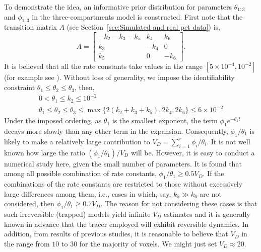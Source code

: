 To demonstrate the idea, an informative prior distribution for parameters $\theta_{1:3}$ and $\phi_{1:3}$ in the three-compartments model is constructed. First note that the transition matrix $A$ (see Section~\ref{sec:Simulated and real pet data}) is,
\begin{equation*}
  A = \begin{bmatrix}
    - k_2 - k_3 - k_5 & k_4  & k_6 \\
    k_3               & -k_4 & 0   \\
    k_5               & 0    & -k_6
  \end{bmatrix}.
\end{equation*}
It is believed that all the rate constants take values in the range $[5 \times 10^{-4}, 10^{-2}]$ (for example see \cite{Zhou2013,Peng:2008fx}). Without loss of generality, we impose the identifiability constraint $\theta_1 \leq \theta_2 \leq \theta_3$, then,
\begin{gather}
  0 < \theta_1 \le k_2 \le 10^{-2} \\
  \theta_1 \leq \theta_2 \leq \theta_3 \leq \max\{2(k_2 + k_3 + k_5), 2k_4,
  2k_6\} \le 6 \times 10^{-2}
\end{gather}
Under the imposed ordering, as $\theta_1$ is the smallest exponent, the term $\phi_1e^{-\theta_1 t}$ decays more slowly than any other term in the expansion. Consequently, $\phi_1/\theta_1$ is likely to make a relatively large contribution to $V_D = \sum_{i=1}^r \phi_i/\theta_i$. It is not well known how large the ratio $(\phi_1/\theta_1)/V_D$ will be. However, it is easy to conduct a numerical study here, given the small number of parameters. It is found that among all possible combination of rate constants, $\phi_1/ \theta_1 \ge 0.5 V_D$. If the combinations of the rate constants are restricted to those without excessively large differences among them, i.e., cases in which, say, $k_5 \gg k_6$ are not considered, then $\phi_1/\theta_1 \ge 0.7 V_D$. The reason for not considering these cases is that such irreversible (trapped) models yield infinite $V_D$ estimates and it is generally known in advance that the tracer employed will exhibit reversible dynamics. In addition, from results of previous studies, it is reasonable to believe that $V_D$ in the range from $10$ to $30$ for the majority of voxels. We might just set $V_D\approx 20$.

